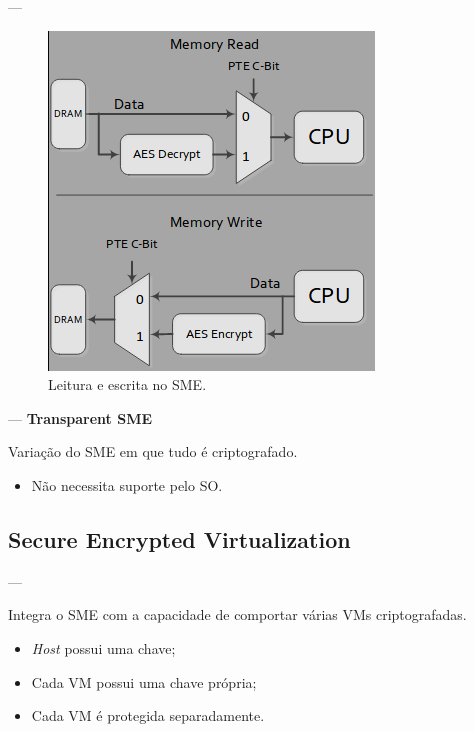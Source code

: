 \documentclass{beamer}
\newcommand{\innertitle}[1]{\textbf{\large {#1}}}
\newcommand{\autotitle}[1]{\secname{} --- \subsecname}
\begin{document}
\begin{frame}{\autotitle{}}
    \begin{figure}
        \centering
        \includegraphics[keepaspectratio,height=.8\textheight]{img/sme_read_write_architecture}
        \caption{Leitura e escrita no SME.}
    \end{figure}
\end{frame}

\begin{frame}{\autotitle{}}
    \innertitle{Transparent SME}

    Variação do SME em que tudo é criptografado.

    \begin{itemize}
        \item Não necessita suporte pelo SO\@.
    \end{itemize}
\end{frame}

\subsection{Secure Encrypted Virtualization}

\begin{frame}{\autotitle{}}
    \innertitle{\subsecname}

    Integra o SME com a capacidade de comportar várias VMs criptografadas.

    \begin{itemize}
        \item \textit{Host} possui uma chave;
        \item Cada VM possui uma chave própria;
        \item Cada VM é protegida separadamente.
    \end{itemize}
\end{frame}
\end{document}
